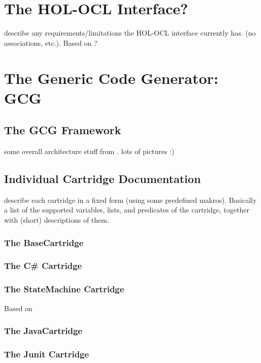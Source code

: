 \documentclass[bibtotoc,liststotoc]{scrbook}
\begin{document}
\chapter{The HOL-OCL Interface?}

describe any requirements/limitations the HOL-OCL interface currently
has. (no associations, etc.). Based on
\cite{brucker.ea:hol-ocl-book:2006}? 

\chapter{The Generic Code Generator: GCG}

\section{The GCG Framework}

some overall architecture stuff from
\cite{eidenbenz:development:2006}. lots of 
pictures :)  

\section{Individual Cartridge Documentation}

describe each cartridge in a fixed form (using some predefined
makros). Basically a list of the supported variables, lists, and
predicates of the cartridge, together with (short) descriptions of
them. 

\subsection{The BaseCartridge}

\subsection{The C\# Cartridge}

\subsection{The StateMachine Cartridge}
Based on \cite{adelsberger:development:2006}

\subsection{The JavaCartridge}

\subsection{The Junit Cartridge}
\end{document}
